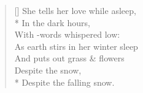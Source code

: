 \documentclass[MAIN]{subfiles}
\begin{document}
\begin{verse}[\versewidth]
She tells her love while  asleep,\\*
In the dark hours,\\
With -words whispered low:\\
As earth stirs in her winter sleep\\
And puts out grass \& flowers\\
Despite the snow,\\*
Despite the falling snow.
\end{verse}
\end{document}
